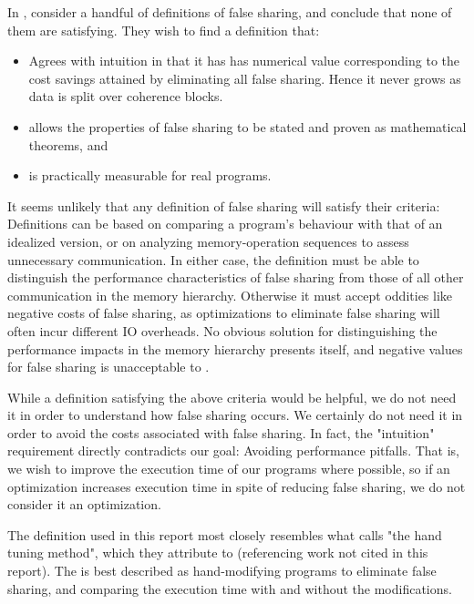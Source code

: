 In \citeyear{falsedef}, \citeauthor{falsedef} \cite{falsedef} consider a handful
of definitions of false sharing, and conclude that none of them are satisfying.
They wish to find a definition that:

\begin{itemize}
	\item Agrees with intuition in that it has has numerical value
		corresponding to the cost savings attained by eliminating all
		false sharing. Hence it never grows as data is split over
		coherence blocks.
	\item allows the properties of false sharing to be stated and proven as
		mathematical theorems, and
	\item is practically measurable for real programs.
\end{itemize}

It seems unlikely that any definition of false sharing will satisfy their
criteria: Definitions can be based on comparing a program's
behaviour with that of an idealized version\footnotemark, or on analyzing
memory-operation sequences to assess unnecessary communication. In either case,
the definition must be able to distinguish the performance characteristics of false
sharing from those of all other communication in the memory hierarchy. Otherwise
it must accept oddities like negative costs of false sharing, as optimizations
to eliminate false sharing will often incur different IO overheads. No obvious
solution for distinguishing the performance impacts in the memory hierarchy
presents itself, and negative values for false sharing is unacceptable to
\citeauthor{falsedef}.

While a definition satisfying the above criteria would be helpful, we do not
need it in order to understand how false sharing occurs. We certainly
do not need it in order to avoid the costs associated with false sharing. In
fact, the "intuition" requirement directly contradicts our goal: Avoiding
performance pitfalls. That is, we wish to improve the execution time of our
programs where possible, so if an optimization increases execution time in spite
of reducing false sharing, we do not consider it an optimization.

The definition used in this report most closely resembles what
\citeauthor{falsedef} calls "the hand tuning method", which they attribute to
\citeauthor{eggersReducing} (referencing work not cited in this report). The
is best described as hand-modifying programs to eliminate false sharing, and
comparing the execution time with and without the modifications.



